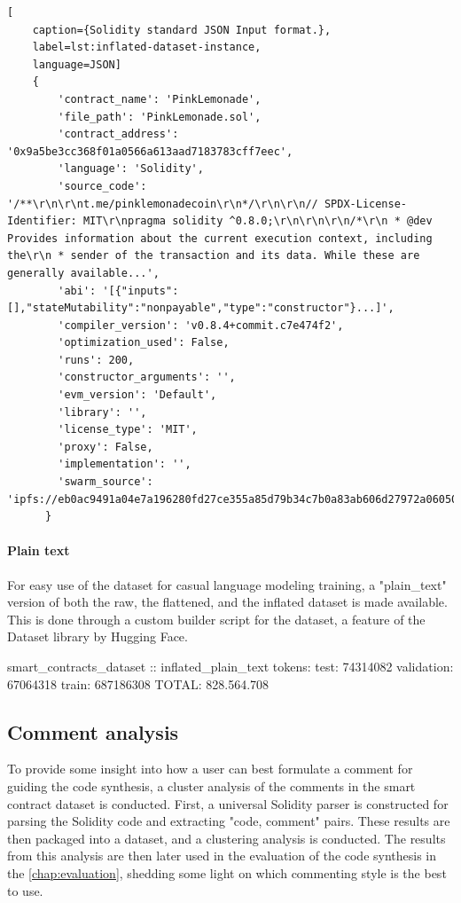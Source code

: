 \begin{lstlisting}[
    caption={Solidity standard JSON Input format.},
    label=lst:inflated-dataset-instance,
    language=JSON]
    {
        'contract_name': 'PinkLemonade',
        'file_path': 'PinkLemonade.sol',
        'contract_address': '0x9a5be3cc368f01a0566a613aad7183783cff7eec',
        'language': 'Solidity',
        'source_code': '/**\r\n\r\nt.me/pinklemonadecoin\r\n*/\r\n\r\n// SPDX-License-Identifier: MIT\r\npragma solidity ^0.8.0;\r\n\r\n\r\n/*\r\n * @dev Provides information about the current execution context, including the\r\n * sender of the transaction and its data. While these are generally available...',
        'abi': '[{"inputs":[],"stateMutability":"nonpayable","type":"constructor"}...]',
        'compiler_version': 'v0.8.4+commit.c7e474f2',
        'optimization_used': False,
        'runs': 200,
        'constructor_arguments': '',
        'evm_version': 'Default',
        'library': '',
        'license_type': 'MIT',
        'proxy': False,
        'implementation': '',
        'swarm_source': 'ipfs://eb0ac9491a04e7a196280fd27ce355a85d79b34c7b0a83ab606d27972a06050c'
      }
\end{lstlisting}

\paragraph{Plain text}
\label{sec:verified-smart-contracts-plain-text}
For easy use of the dataset for casual language modeling training, a "plain\_text" version of both the raw, the flattened, and the inflated dataset is made available. This is done through a custom builder script for the dataset, a feature of the Dataset library by Hugging Face.

smart\_contracts\_dataset :: inflated\_plain\_text tokens:
	test: 74314082
	validation: 67064318
	train: 687186308
TOTAL: 828.564.708

\FloatBarrier

\subsection{Comment analysis}
\label{sec:comment-analysis}
To provide some insight into how a user can best formulate a comment for guiding the code synthesis, a cluster analysis of the comments in the smart contract dataset is conducted. First, a universal Solidity parser is constructed for parsing the Solidity code and extracting "code, comment" pairs. These results are then packaged into a dataset, and a clustering analysis is conducted. The results from this analysis are then later used in the evaluation of the code synthesis in the \ref{chap:evaluation}, shedding some light on which commenting style is the best to use.


